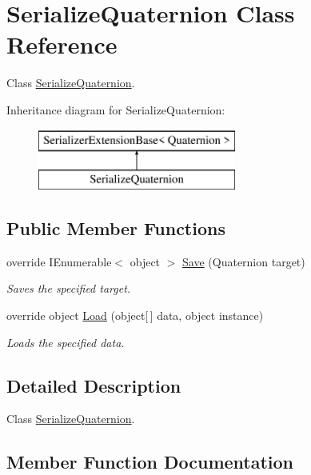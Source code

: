 \hypertarget{class_serialize_quaternion}{}\section{Serialize\+Quaternion Class Reference}
\label{class_serialize_quaternion}


Class \hyperlink{class_serialize_quaternion}{Serialize\+Quaternion}.  


Inheritance diagram for Serialize\+Quaternion\+:\begin{figure}[H]
\begin{center}
\leavevmode
\includegraphics[height=2.000000cm]{class_serialize_quaternion}
\end{center}
\end{figure}
\subsection*{Public Member Functions}
\begin{DoxyCompactItemize}
\item 
override I\+Enumerable$<$ object $>$ \hyperlink{class_serialize_quaternion_aac8d597d978662eb8943fc54964ba947}{Save} (Quaternion target)
\begin{DoxyCompactList}\small\item\em Saves the specified target. \end{DoxyCompactList}\item 
override object \hyperlink{class_serialize_quaternion_a0c239eb6d19dd934bdcc7beca614e316}{Load} (object\mbox{[}$\,$\mbox{]} data, object instance)
\begin{DoxyCompactList}\small\item\em Loads the specified data. \end{DoxyCompactList}\end{DoxyCompactItemize}


\subsection{Detailed Description}
Class \hyperlink{class_serialize_quaternion}{Serialize\+Quaternion}. 



\subsection{Member Function Documentation}
\mbox{\label{class_serialize_quaternion_a0c239eb6d19dd934bdcc7beca614e316}} 
